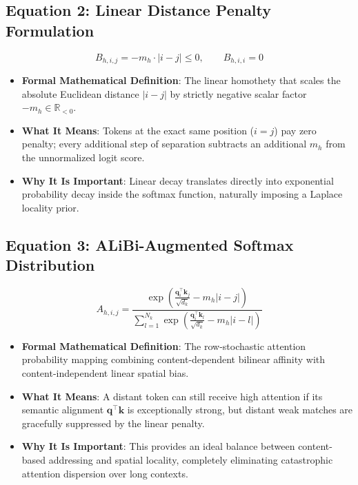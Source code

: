 \documentclass[11pt,a4paper]{article}
\theoremstyle{definition}
\begin{document}
\subsection{\textbf{Equation 2: Linear Distance Penalty Formulation}}
{\boldmath
\begin{equation}
B_{h, i, j} = -m_h \cdot |i - j| \le 0, \qquad B_{h, i, i} = 0
\end{equation}
}
\begin{itemize}
    \item \textbf{Formal Mathematical Definition}:
    The linear homothety that scales the absolute Euclidean distance $|i - j|$ by strictly negative scalar factor $-m_h \in \mathbb{R}_{< 0}$.
    \item \textbf{What It Means}:
    Tokens at the exact same position ($i = j$) pay zero penalty; every additional step of separation subtracts an additional $m_h$ from the unnormalized logit score.
    \item \textbf{Why It Is Important}:
    Linear decay translates directly into exponential probability decay inside the softmax function, naturally imposing a Laplace locality prior.
\end{itemize}

\subsection{\textbf{Equation 3: ALiBi-Augmented Softmax Distribution}}
{\boldmath
\begin{equation}
A_{h, i, j} = \frac{\exp\left( \frac{\mathbf{q}_i^\top \mathbf{k}_j}{\sqrt{d_k}} - m_h |i - j| \right)}{\sum_{l=1}^{N_k} \exp\left( \frac{\mathbf{q}_i^\top \mathbf{k}_l}{\sqrt{d_k}} - m_h |i - l| \right)}
\end{equation}
}
\begin{itemize}
    \item \textbf{Formal Mathematical Definition}:
    The row-stochastic attention probability mapping combining content-dependent bilinear affinity with content-independent linear spatial bias.
    \item \textbf{What It Means}:
    A distant token can still receive high attention if its semantic alignment $\mathbf{q}^\top \mathbf{k}$ is exceptionally strong, but distant weak matches are gracefully suppressed by the linear penalty.
    \item \textbf{Why It Is Important}:
    This provides an ideal balance between content-based addressing and spatial locality, completely eliminating catastrophic attention dispersion over long contexts.
\end{itemize}
\end{document}

